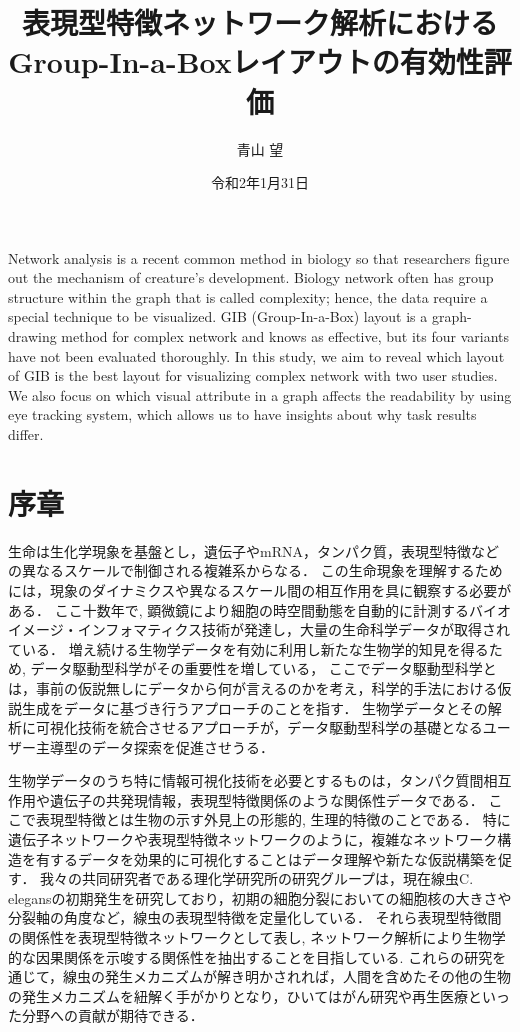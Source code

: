 \documentclass{kuee}
\title{表現型特徴ネットワーク解析におけるGroup-In-a-Boxレイアウトの有効性評価}
\author{青山 望}
\date{令和2年1月31日}
\begin{document}
\maketitle      %
\begin{eabstract}   %
Network analysis is a recent common method in biology so that researchers figure out the mechanism of creature's development.
Biology network often has group structure within the graph that is called complexity; hence, the data require a special technique to be visualized.
GIB (Group-In-a-Box) layout is a graph-drawing method for complex network and knows as effective, but its four variants have not been evaluated thoroughly.
In this study, we aim to reveal which layout of GIB is the best layout for visualizing complex network with two user studies.
We also focus on which visual attribute in a graph affects the readability by using eye tracking system, which allows us to have insights about why task results differ.
\end{eabstract}
\tableofcontents    %
{}
\chapter{序章}
\label{chap:intro}

生命は生化学現象を基盤とし，遺伝子やmRNA，タンパク質，表現型特徴などの異なるスケールで制御される複雑系からなる．
この生命現象を理解するためには，現象のダイナミクスや異なるスケール間の相互作用を具に観察する必要がある．
ここ十数年で, 顕微鏡により細胞の時空間動態を自動的に計測するバイオイメージ・インフォマティクス技術が発達し，大量の生命科学データが取得されている．
増え続ける生物学データを有効に利用し新たな生物学的知見を得るため, データ駆動型科学がその重要性を増している，
ここでデータ駆動型科学とは，事前の仮説無しにデータから何が言えるのかを考え，科学的手法における仮説生成をデータに基づき行うアプローチのことを指す．
生物学データとその解析に可視化技術を統合させるアプローチが，データ駆動型科学の基礎となるユーザー主導型のデータ探索を促進させうる．

生物学データのうち特に情報可視化技術を必要とするものは，タンパク質間相互作用や遺伝子の共発現情報，表現型特徴関係のような関係性データである．
ここで表現型特徴とは生物の示す外見上の形態的, 生理的特徴のことである．
特に遺伝子ネットワークや表現型特徴ネットワークのように，複雑なネットワーク構造を有するデータを効果的に可視化することはデータ理解や新たな仮説構築を促す．
我々の共同研究者である理化学研究所の研究グループは，現在線虫C. elegansの初期発生を研究しており，初期の細胞分裂においての細胞核の大きさや分裂軸の角度など，線虫の表現型特徴を定量化している．
それら表現型特徴間の関係性を表現型特徴ネットワークとして表し, ネットワーク解析により生物学的な因果関係を示唆する関係性を抽出することを目指している.
これらの研究を通じて，線虫の発生メカニズムが解き明かされれば，人間を含めたその他の生物の発生メカニズムを紐解く手がかりとなり，ひいてはがん研究や再生医療といった分野への貢献が期待できる．
\end{document}
